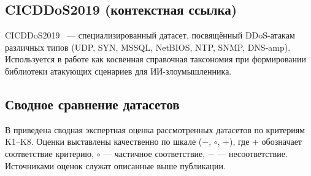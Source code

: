 \subsection{CICDDoS2019 (контекстная ссылка)}

CICDDoS2019~\cite{sharafaldin2019ddos} --- специализированный датасет,
посвящённый DDoS-атакам различных типов (UDP, SYN, MSSQL, NetBIOS, NTP, SNMP,
DNS-amp). Используется в работе как косвенная справочная таксономия при
формировании библиотеки атакующих сценариев для ИИ-злоумышленника.

\subsection{Сводное сравнение датасетов}

В  приведена сводная экспертная оценка
рассмотренных датасетов по критериям K1--K8. Оценки выставлены качественно по
шкале (\(-\), \(\circ\), \(+\)), где \(+\) обозначает соответствие критерию,
\(\circ\) --- частичное соответствие, \(-\) --- несоответствие. Источниками
оценок служат описанные выше публикации.

